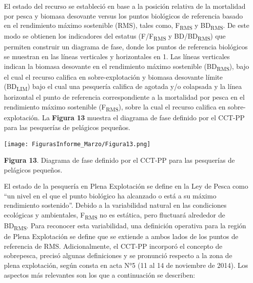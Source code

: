 \documentclass[
  spanish,
]{article}
\begin{document}
El estado del recurso se estableció en base a la posición relativa de la
mortalidad por pesca y biomasa desovante versus los puntos biológicos de
referencia basado en el rendimiento máximo sostenible (RMS), tales como,
F\textsubscript{RMS} y BD\textsubscript{RMS}. De este modo se obtienen
los indicadores del estatus (F/F\textsubscript{RMS} y
BD/BD\textsubscript{RMS}) que permiten construir un diagrama de fase,
donde los puntos de referencia biológicos se muestran en las líneas
verticales y horizontales en 1. Las líneas verticales indican la biomasa
desovante en el rendimiento máximo sostenible (BD\textsubscript{RMS}),
bajo el cual el recurso califica en sobre-explotación y biomasa
desovante límite (BD\textsubscript{LIM}) bajo el cual una pesquería
califica de agotada y/o colapsada y la línea horizontal el punto de
referencia correspondiente a la mortalidad por pesca en el rendimiento
máximo sostenible (F\textsubscript{RMS}), sobre la cual el recurso
califica en sobre-explotación. La \textbf{Figura 13} muestra el diagrama
de fase definido por el CCT-PP para las pesquerías de pelágicos
pequeños.

\begin{center}
\texttt{[image: FigurasInforme\_Marzo/Figura13.png]}
\end{center}

\small

\textbf{Figura 13}. Diagrama de fase definido por el CCT-PP para las
pesquerías de pelágicos pequeños. \vspace{0.5cm}

\normalsize

El estado de la pesquería en Plena Explotación se define en la Ley de
Pesca como ``un nivel en el que el punto biológico ha alcanzado o está a
su máximo rendimiento sostenido''. Debido a la variabilidad natural en
las condiciones ecológicas y ambientales, F\textsubscript{RMS} no es
estática, pero fluctuará alrededor de BD\textsubscript{RMS}. Para
reconocer esta variabilidad, una definición operativa para la región de
Plena Explotación se define que se extiende a ambos lados de los puntos
de referencia de RMS. Adicionalmente, el CCT-PP incorporó el concepto de
sobrepesca, precisó algunas definiciones y se pronunció respecto a la
zona de plena explotación, según consta en acta N°5 (11 al 14 de
noviembre de 2014). Los aspectos más relevantes son los que a
continuación se describen:
\end{document}
